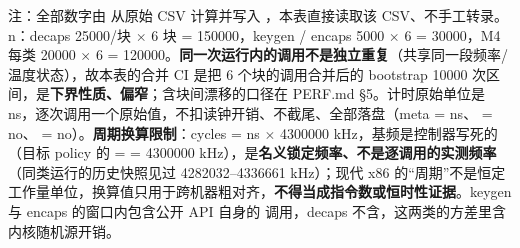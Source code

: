\documentclass[UTF8,fontset=fandol,11pt,a4paper]{ctexart}
\begin{document}
\begin{landscape}
\noindent 注：全部数字由 \texttt{} 从原始 CSV 计算并写入 \texttt{}，本表直接读取该 CSV、不手工转录。n：decaps 25000/块 \texorpdfstring{$\times$}{x} 6 块 = 150000，keygen / encaps 5000 \texorpdfstring{$\times$}{x} 6 = 30000，M4 每类 20000 \texorpdfstring{$\times$}{x} 6 = 120000。\textbf{同一次运行内的调用不是独立重复}（共享同一段频率/温度状态），故本表的合并 CI 是把 6 个块的调用合并后的 bootstrap 10000 次区间，是\textbf{下界性质、偏窄}；含块间漂移的口径在 PERF.md §5。计时原始单位是 ns，逐次调用一个原始值，不扣读钟开销、不截尾、全部落盘（meta \texttt{} = ns、\texttt{} = no、\texttt{} = no）。\textbf{周期换算限制}：cycles = ns \texorpdfstring{$\times$}{x} 4300000 kHz，基频是控制器写死的 \texttt{}（目标 policy 的 \texttt{} = \texttt{} = 4300000 kHz），是\textbf{名义锁定频率、不是逐调用的实测频率}（同类运行的历史快照见过 4282032–4336661 kHz）；现代 x86 的“周期”不是恒定工作量单位，换算值只用于跨机器粗对齐，\textbf{不得当成指令数或恒时性证据}。keygen 与 encaps 的窗口内包含公开 API 自身的 \texttt{} 调用，decaps 不含，这两类的方差里含内核随机源开销。\par\endgroup\vspace{3mm}\end{landscape}
\end{document}
